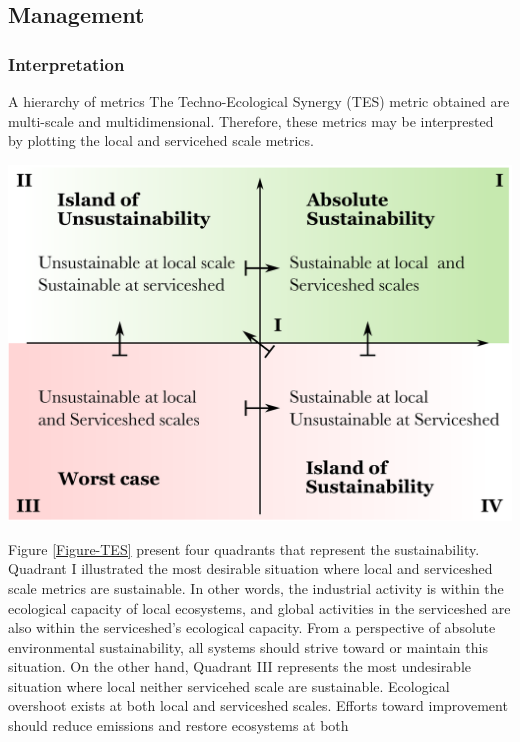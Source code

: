 \documentclass[
  14pt,
]{extarticle}
\begin{document}
\hypertarget{management}{%
\subsection{Management}\label{management}}

\hypertarget{interpretation}{%
\subsubsection{Interpretation}\label{interpretation}}

A hierarchy of metrics
The Techno-Ecological Synergy (TES) metric obtained are multi-scale and multidimensional.
Therefore, these metrics may be interprested by plotting the local and servicehed scale metrics.

\includegraphics[width=1\linewidth]{Figures/Quadrantes-sustainability}

Figure \ref{Figure-TES} present four quadrants that represent the sustainability.
Quadrant I illustrated the most desirable situation where local and serviceshed scale metrics are sustainable.
In other words, the industrial activity is within the ecological capacity of local ecosystems, and global activities in the serviceshed are also within the serviceshed's ecological capacity.
From a perspective of absolute environmental sustainability, all systems should strive toward or maintain this situation.
On the other hand, Quadrant III represents the most undesirable situation where local neither servicehed scale are sustainable.
Ecological overshoot exists at both local and serviceshed scales.
Efforts toward improvement should reduce emissions and restore ecosystems at both
\end{document}
